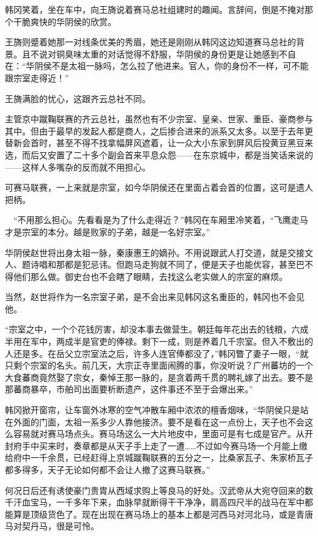 韩冈笑着，坐在车中，向王旖说着赛马总社组建时的趣闻。言辞间，倒是不掩对那个干脆爽快的华阴侯的欣赏。

王旖则蹙着她那一对线条优美的秀眉，她还是刚刚从韩冈这边知道赛马总社的背景。且不说对铜臭味太重的对话觉得不舒服，华阴侯的身份更是让她感到不自在：“华阴侯不是太祖一脉吗，怎么拉了他进来。官人，你的身份不一样，可不能跟宗室走得近！”

王旖满脸的忧心，这跟齐云总社不同。

主管京中蹴鞠联赛的齐云总社，虽然也有不少宗室、皇亲、世家、重臣、豪商参与其中。但由于最早的发起人都是商人，之后掺合进来的派系又太多。以至于去年更替新会首时，甚至不得不找拿幅屏风遮着，让一众大小东家到屏风后投黄豆黑豆来选，而后又安置了二十多个副会首来平息众怨——在东京城中，都是当笑话来说的——这样人多嘴杂的反而就不用担心。

可赛马联赛，一上来就是宗室，如今华阴侯还在里面占着会首的位置，这可是遗人把柄。

　“不用那么担心。先看看是为了什么走得近？”韩冈在车厢里冷笑着，“飞鹰走马才是宗室的本分。越是败家的子弟，越是一名好宗室。”

华阴侯赵世将出身太祖一脉，秦康惠王的嫡孙。不用说跟武人打交道，就是交接文人、题诗唱和那都是犯忌讳。但跑马走狗就不同了，便是天子也能优容，甚至巴不得他们那么做。御史台也不会瞎了眼睛，去找这么老实做人的宗室的麻烦。

当然，赵世将作为一名宗室子弟，是不会出来见韩冈这名重臣的，韩冈也不会见他。

“宗室之中，一个个花钱厉害，却没本事去做营生。朝廷每年花出去的钱粮，六成半用在军中，两成半是官吏的俸禄。剩下一成，则是养着几千宗室。但入不敷出的人还是多。在岳父立宗室法之后，许多人连官俸都没了，”韩冈瞥了妻子一眼，“就只剩个宗室的名头。前几天，大宗正寺里面闹腾的事，你没听说？广州蕃坊的一个大食蕃商竟然娶了宗女，秦悼王那一脉的，是贪着两千贯的聘礼嫁了出去。要不是那蕃商暴卒，市舶司出面要析断遗产，这件事还不至于会爆出来。”

韩冈掀开窗帘，让车窗外冰寒的空气冲散车厢中浓浓的檀香烟味，“华阴侯只是站在外面的门面，太祖一系多少人靠他接济。要不是看在这一点份上，天子也不会这么容易就对赛马场点头。赛马场这么一大片地皮中，里面可是有七成是官产。从开封府手中买来时，奏章都是从天子手上走了一遭……不过如今赛马场一个月能上缴给府中一千余贯，已经赶得上京城蹴鞠联赛的五分之一，比桑家瓦子、朱家桥瓦子都多得多，天子无论如何都不会让人撤了这赛马联赛。”

何况日后还有诱使豪门贵胄从西域求购上等良马的好处。汉武帝从大宛夺回来的数千汗血宝马，一千多年下来，血脉早就断得干干净净，肩高四尺半的战马在军中都能算是顶级货色了。现在出现在赛马场上的基本上都是河西马对河北马，或是青唐马对契丹马，很是可怜。

